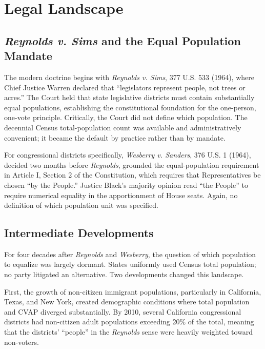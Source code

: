 \section{Legal Landscape}
\label{sec:legal}

\subsection{\emph{Reynolds v. Sims} and the Equal Population Mandate}

The modern doctrine begins with \emph{Reynolds v. Sims}, 377 U.S. 533 (1964), where Chief Justice Warren declared that ``legislators represent people, not trees or acres.'' The Court held that state legislative districts must contain substantially equal populations, establishing the constitutional foundation for the one-person, one-vote principle. Critically, the Court did not define which population. The decennial Census total-population count was available and administratively convenient; it became the default by practice rather than by mandate.

For congressional districts specifically, \emph{Wesberry v. Sanders}, 376 U.S. 1 (1964), decided two months before \emph{Reynolds}, grounded the equal-population requirement in Article I, Section 2 of the Constitution, which requires that Representatives be chosen ``by the People.'' Justice Black's majority opinion read ``the People'' to require numerical equality in the apportionment of House seats. Again, no definition of which population unit was specified.

\subsection{Intermediate Developments}

For four decades after \emph{Reynolds} and \emph{Wesberry}, the question of which population to equalize was largely dormant. States uniformly used Census total population; no party litigated an alternative. Two developments changed this landscape.

First, the growth of non-citizen immigrant populations, particularly in California, Texas, and New York, created demographic conditions where total population and CVAP diverged substantially. By 2010, several California congressional districts had non-citizen adult populations exceeding 20\% of the total, meaning that the districts' ``people'' in the \emph{Reynolds} sense were heavily weighted toward non-voters.

